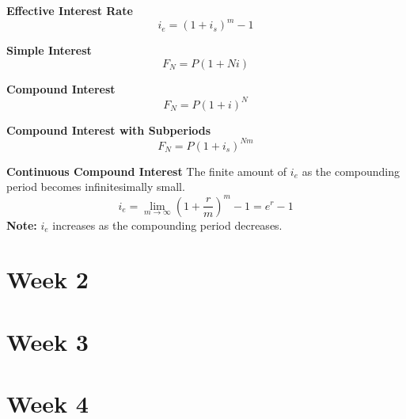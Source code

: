 \documentclass{article}
\begin{document}
    \begin{definition}
        \textbf{Effective Interest Rate}
        \begin{equation}
            i_e = (1 + i_s)^m - 1
        \end{equation}
    \end{definition}
    
    \begin{definition}
        \textbf{Simple Interest} 
        \begin{equation}
            F_N = P(1 + Ni)
        \end{equation}
    \end{definition}

    \begin{definition}
        \textbf{Compound Interest} 
        \begin{equation}
            F_N = P(1 + i)^N
        \end{equation}
    \end{definition}

    \begin{definition}
        \textbf{Compound Interest with Subperiods} 
        \begin{equation}
            F_N = P(1 + i_s)^{Nm}
        \end{equation}
    \end{definition}

    \begin{definition}
        \textbf{Continuous Compound Interest} The finite amount of \(i_e\) as the compounding period becomes infinitesimally small.
        \begin{equation}
            i_e = \lim_{m \to \infty} (1 + \frac{r}{m})^m - 1 = e^r - 1
        \end{equation}
        \textbf{Note:} \(i_e\) increases as the compounding period decreases.
    \end{definition}

    \section{Week 2}


    \section{Week 3}

    \section{Week 4}
\end{document}
